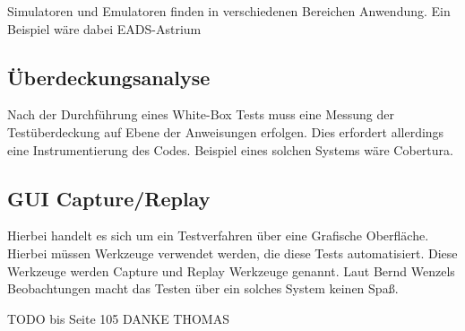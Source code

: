 Simulatoren und Emulatoren finden in verschiedenen Bereichen Anwendung. Ein Beispiel wäre dabei EADS-Astrium

\subsection{Überdeckungsanalyse}
Nach der Durchführung eines White-Box Tests muss eine Messung der Testüberdeckung auf Ebene der Anweisungen erfolgen. Dies erfordert allerdings eine Instrumentierung des Codes. Beispiel eines solchen Systems wäre Cobertura.

\subsection{GUI Capture/Replay}
Hierbei handelt es sich um ein Testverfahren über eine Grafische Oberfläche. Hierbei müssen Werkzeuge verwendet werden, die diese Tests automatisiert. Diese Werkzeuge werden Capture und Replay Werkzeuge genannt. Laut Bernd Wenzels Beobachtungen macht das Testen über ein solches System keinen Spaß. 

TODO bis Seite 105 DANKE THOMAS